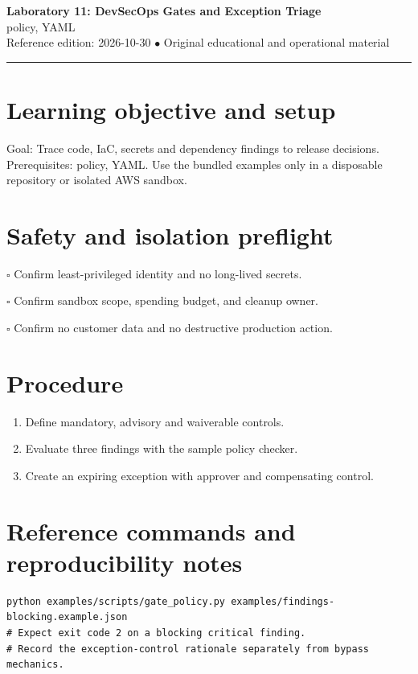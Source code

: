 \documentclass[10pt,letterpaper]{article}
\begin{document}
\begin{center}
{\LARGE\bfseries\color{cdblue}Laboratory 11: DevSecOps Gates and Exception Triage}\\[7pt]
{\large policy, YAML}\\[6pt]
{\small Reference edition: 2026-10-30 $\bullet$ Original educational and operational material}
\end{center}
\noindent\color{cdblue}\rule{\linewidth}{1.2pt}\color{black}
\vspace{0.4em}
\section{Learning objective and setup}
Goal: Trace code, IaC, secrets and dependency findings to release decisions. Prerequisites: policy, YAML. Use the bundled examples only in a disposable repository or isolated AWS sandbox.


\section{Safety and isolation preflight}
\noindent $\square$ Confirm least-privileged identity and no long-lived secrets.\par\vspace{0.35em}
\noindent $\square$ Confirm sandbox scope, spending budget, and cleanup owner.\par\vspace{0.35em}
\noindent $\square$ Confirm no customer data and no destructive production action.\par\vspace{0.35em}

\section{Procedure}
\begin{enumerate}
\item Define mandatory, advisory and waiverable controls.
\item Evaluate three findings with the sample policy checker.
\item Create an expiring exception with approver and compensating control.
\end{enumerate}

\section{Reference commands and reproducibility notes}
\begin{verbatim}
python examples/scripts/gate_policy.py examples/findings-blocking.example.json
# Expect exit code 2 on a blocking critical finding.
# Record the exception-control rationale separately from bypass mechanics.
\end{verbatim}
\end{document}
